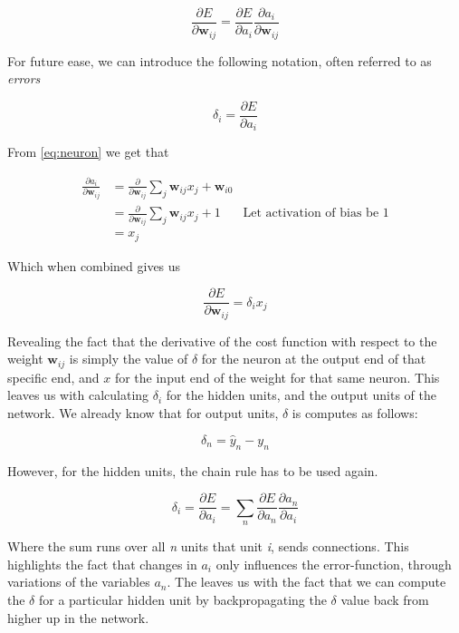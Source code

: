 \begin{equation}
\frac{\partial E}{\partial \pmb{w}_{ij}} = \frac{\partial E}{\partial a_i}
\frac{\partial a_i}{\partial \pmb{w}_{ij}}
\end{equation}

For future ease, we can introduce the following notation, often referred
to as \textit{errors}

\begin{equation}
\delta_i = \frac{\partial E}{\partial a_i}
\end{equation}

From \eqref{eq:neuron} we get that 

\begin{align}
\frac{\partial a_i}{\partial \pmb{w}_{ij}} &= \frac{\partial}{\partial \pmb{w}_{ij}} 
\sum_j \pmb{w}_{ij} x_j + \pmb{w}_{i0}\\
&= \frac{\partial}{\partial \pmb{w}_{ij}} \sum_j \pmb{w}_{ij} x_j + 1 
& \text{Let activation of bias be 1}\\
&= x_j 
\end{align}

Which when combined gives us

\begin{equation}
\label{eq:deriv}
\frac{\partial E}{\partial \pmb{w}_{ij}} = \delta_i x_j
\end{equation}

Revealing the fact that the derivative of the cost function with respect to the
weight $\pmb{w}_{ij}$ is simply the value of $\delta$ for the neuron at the
output end of that specific end, and $x$ for the input end of the weight for
that same neuron. This leaves us with calculating $\delta_i$ for the hidden
units, and the output units of the network. 
We already know that for output units, $\delta$ is computes as follows:

\begin{equation}
\label{eq:output}
\delta_n = \hat{y}_n - y_n
\end{equation}

However, for the hidden units, the chain rule has to be used again.

\begin{equation}
\label{eq:bp}
\delta_i = \frac{\partial E}{\partial a_i} = \sum_n \frac{\partial E}{\partial a_n}
\frac{\partial a_n}{\partial a_i}
\end{equation}

Where the sum runs over all \textit{n} units that unit \textit{i}, sends
connections. This highlights the fact that changes in $a_i$ only influences
the error-function, through variations of the variables $a_n$. The leaves us 
with the fact that we can compute the $\delta$ for a particular hidden unit
by backpropagating the $\delta$ value back from higher up in the network.

